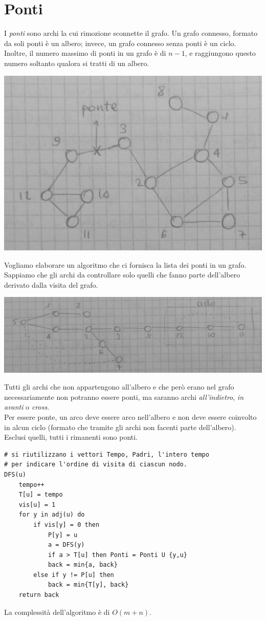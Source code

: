 \section{Ponti}
I \textit{ponti} sono archi la cui rimozione sconnette il grafo. Un grafo connesso, formato da soli ponti è un albero; invece, un grafo connesso senza ponti è un ciclo. \\
Inoltre, il numero massimo di ponti in un grafo è di $n-1$, e raggiungono questo numero soltanto qualora si tratti di un albero.
\begin{center}
    \includegraphics[width=.4\textwidth]{res/ponti-grafo.jpg} \hfill
\end{center}
Vogliamo elaborare un algoritmo che ci fornisca la lista dei ponti in un grafo.
Sappiamo che gli archi da controllare solo quelli che fanno parte dell'albero derivato dalla visita del grafo.
\begin{center}
    \includegraphics[width=.6\textwidth]{res/ponti-albero.jpg} \hfill
\end{center}
Tutti gli archi che non appartengono all'albero e che però erano nel grafo necessariamente non potranno essere ponti, ma saranno archi \textit{all'indietro}, \textit{in avanti} o \textit{cross}. \\
Per essere ponte, un arco deve essere arco nell'albero e non deve essere coinvolto in alcun ciclo (formato che tramite gli archi non facenti parte dell'albero). \\
Esclusi quelli, tutti i rimanenti sono ponti.
\begin{lstlisting}
# si riutilizzano i vettori Tempo, Padri, l'intero tempo
# per indicare l'ordine di visita di ciascun nodo.
DFS(u)
    tempo++
    T[u] = tempo
	vis[u] = 1 
	for y in adj(u) do
		if vis[y] = 0 then
			P[y] = u
			a = DFS(y)
			if a > T[u] then Ponti = Ponti U {y,u}
			back = min{a, back}
		else if y != P[u] then
		    back = min{T[y], back}
	return back
\end{lstlisting}
La complessità dell'algoritmo è di $O(m+n)$.

